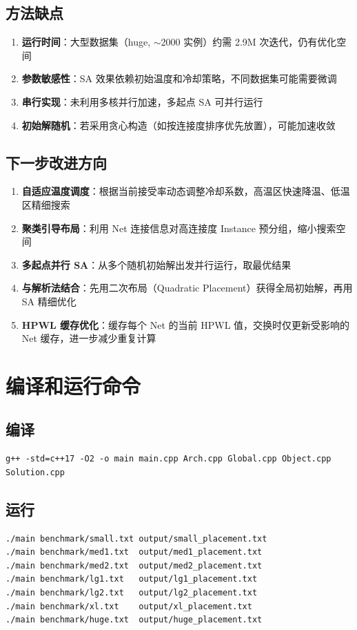 \documentclass[12pt,a4paper]{ctexart}
\begin{document}
\subsection{方法缺点}

\begin{enumerate}[label=(\arabic*), leftmargin=*]
    \item \textbf{运行时间}：大型数据集（huge, $\sim$2000 实例）约需 2.9M 次迭代，仍有优化空间
    \item \textbf{参数敏感性}：SA 效果依赖初始温度和冷却策略，不同数据集可能需要微调
    \item \textbf{串行实现}：未利用多核并行加速，多起点 SA 可并行运行
    \item \textbf{初始解随机}：若采用贪心构造（如按连接度排序优先放置），可能加速收敛
\end{enumerate}

\subsection{下一步改进方向}

\begin{enumerate}[label=(\arabic*), leftmargin=*]
    \item \textbf{自适应温度调度}：根据当前接受率动态调整冷却系数，高温区快速降温、低温区精细搜索
    \item \textbf{聚类引导布局}：利用 Net 连接信息对高连接度 Instance 预分组，缩小搜索空间
    \item \textbf{多起点并行 SA}：从多个随机初始解出发并行运行，取最优结果
    \item \textbf{与解析法结合}：先用二次布局（Quadratic Placement）获得全局初始解，再用 SA 精细优化
    \item \textbf{HPWL 缓存优化}：缓存每个 Net 的当前 HPWL 值，交换时仅更新受影响的 Net 缓存，进一步减少重复计算
\end{enumerate}

\appendix
\section{编译和运行命令}

\subsection*{编译}
\begin{verbatim}
g++ -std=c++17 -O2 -o main main.cpp Arch.cpp Global.cpp Object.cpp Solution.cpp
\end{verbatim}

\subsection*{运行}
\begin{verbatim}
./main benchmark/small.txt output/small_placement.txt
./main benchmark/med1.txt  output/med1_placement.txt
./main benchmark/med2.txt  output/med2_placement.txt
./main benchmark/lg1.txt   output/lg1_placement.txt
./main benchmark/lg2.txt   output/lg2_placement.txt
./main benchmark/xl.txt    output/xl_placement.txt
./main benchmark/huge.txt  output/huge_placement.txt
\end{verbatim}
\end{document}
